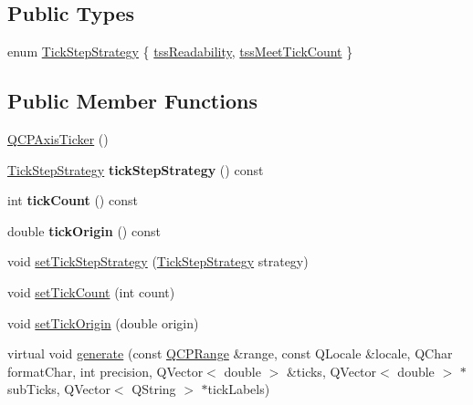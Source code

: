\subsection*{Public Types}
\begin{DoxyCompactItemize}
\item 
enum \hyperlink{classQCPAxisTicker_ab6d2f9d9477821623ac9bc4b21ddf49a}{Tick\+Step\+Strategy} \{ \hyperlink{classQCPAxisTicker_ab6d2f9d9477821623ac9bc4b21ddf49aa9002aa2fd5633ab5556c71a26fed63a8}{tss\+Readability}, 
\hyperlink{classQCPAxisTicker_ab6d2f9d9477821623ac9bc4b21ddf49aa770312b6b9b0c64a37ceeba96e0cd7f2}{tss\+Meet\+Tick\+Count}
 \}
\end{DoxyCompactItemize}
\subsection*{Public Member Functions}
\begin{DoxyCompactItemize}
\item 
\hyperlink{classQCPAxisTicker_a8fcf23c79ebd72202fe79253f9f01ea8}{Q\+C\+P\+Axis\+Ticker} ()
\item 
\hyperlink{classQCPAxisTicker_ab6d2f9d9477821623ac9bc4b21ddf49a}{Tick\+Step\+Strategy} {\bfseries tick\+Step\+Strategy} () const \hypertarget{classQCPAxisTicker_adbde618e69fee8215e90aab20eb7fe88}{}\label{classQCPAxisTicker_adbde618e69fee8215e90aab20eb7fe88}

\item 
int {\bfseries tick\+Count} () const \hypertarget{classQCPAxisTicker_a860d9fbe9762abd19560b27b2b803f14}{}\label{classQCPAxisTicker_a860d9fbe9762abd19560b27b2b803f14}

\item 
double {\bfseries tick\+Origin} () const \hypertarget{classQCPAxisTicker_a521d8e0d3dc5b711bad3582c1473d333}{}\label{classQCPAxisTicker_a521d8e0d3dc5b711bad3582c1473d333}

\item 
void \hyperlink{classQCPAxisTicker_a73b1d847c1a12159af6bfda4ebebe7d5}{set\+Tick\+Step\+Strategy} (\hyperlink{classQCPAxisTicker_ab6d2f9d9477821623ac9bc4b21ddf49a}{Tick\+Step\+Strategy} strategy)
\item 
void \hyperlink{classQCPAxisTicker_a47752abba8293e6dc18491501ae34008}{set\+Tick\+Count} (int count)
\item 
void \hyperlink{classQCPAxisTicker_ab509c7e500293bf66a8409f0d7c23943}{set\+Tick\+Origin} (double origin)
\item 
virtual void \hyperlink{classQCPAxisTicker_aefbd11725678ca824add8cf926cbc856}{generate} (const \hyperlink{classQCPRange}{Q\+C\+P\+Range} \&range, const Q\+Locale \&locale, Q\+Char format\+Char, int precision, Q\+Vector$<$ double $>$ \&ticks, Q\+Vector$<$ double $>$ $\ast$sub\+Ticks, Q\+Vector$<$ Q\+String $>$ $\ast$tick\+Labels)
\end{DoxyCompactItemize}
